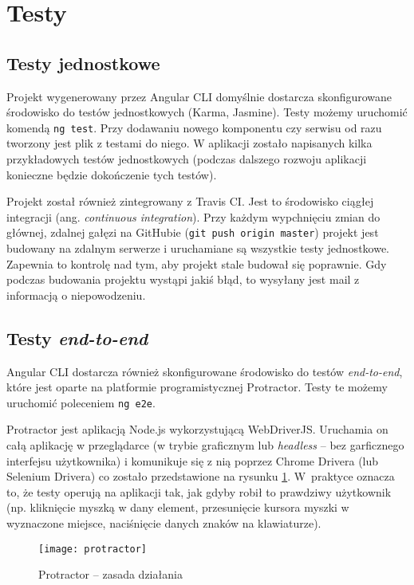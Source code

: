 \section{Testy}\label{sec:tests}

\subsection*{Testy jednostkowe}

Projekt wygenerowany przez Angular CLI domyślnie dostarcza skonfigurowane środowisko do testów jednostkowych (Karma, Jasmine). Testy możemy uruchomić komendą \texttt{ng test}. Przy dodawaniu nowego komponentu czy serwisu od razu tworzony jest plik z testami do niego. W aplikacji zostało napisanych kilka przykładowych testów jednostkowych (podczas dalszego rozwoju aplikacji konieczne będzie dokończenie tych testów).

Projekt został również zintegrowany z Travis CI. Jest to środowisko ciągłej integracji (ang. \textit{continuous integration}). Przy każdym wypchnięciu zmian do głównej, zdalnej gałęzi na GitHubie (\texttt{git push origin master}) projekt jest budowany na zdalnym serwerze i uruchamiane są wszystkie testy jednostkowe. Zapewnia to kontrolę nad tym, aby projekt stale budował się poprawnie. Gdy podczas budowania projektu wystąpi jakiś błąd, to wysyłany jest mail z informacją o niepowodzeniu.

\subsection*{Testy \textit{end-to-end}}

Angular CLI dostarcza również skonfigurowane środowisko do testów \textit{end-to-end}, które jest oparte na platformie programistycznej Protractor. Testy te możemy uruchomić poleceniem \texttt{ng e2e}. 

Protractor jest aplikacją Node.js wykorzystującą WebDriverJS. Uruchamia on całą aplikację w przeglądarce (w trybie graficznym lub \textit{headless} -- bez garficznego interfejsu użytkownika) i komunikuje się z nią poprzez Chrome Drivera (lub Selenium Drivera) co zostało przedstawione na rysunku \ref{fig:protractor}. W~praktyce oznacza to, że testy operują na aplikacji tak, jak gdyby robił to prawdziwy użytkownik (np. kliknięcie myszką w dany element, przesunięcie kursora myszki w wyznaczone miejsce, naciśnięcie danych znaków na klawiaturze). 

\begin{figure}[H]
\centering
\texttt{[image: protractor]}
\caption{Protractor -- zasada działania}
\label{fig:protractor}
\end{figure}


